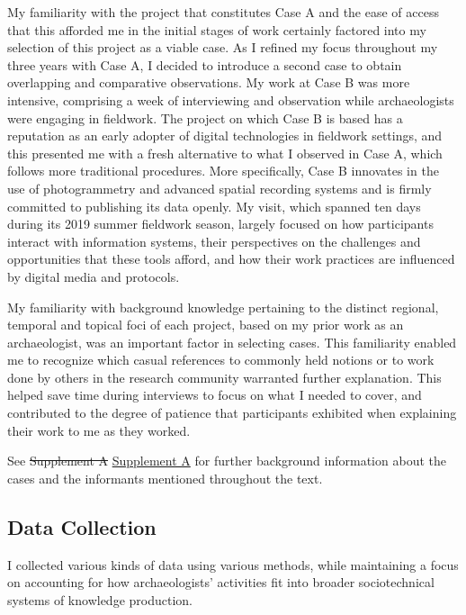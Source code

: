 \documentclass[
]{article}
\makeatletter
\providecommand{\DIFdel}[1]{{\protect\color{red}\sout{#1}}} %
\providecommand{\DIFaddbegin}{} %
\providecommand{\DIFaddend}{} %
\providecommand{\DIFdelbegin}{} %
\providecommand{\DIFdelend}{} %
\newcommand{\DIFscaledelfig}{0.5}
\newlength{\DIFdelgraphicswidth} %
\newlength{\DIFdelgraphicsheight} %
\newcommand{\DIFaddincludegraphics}[2][]{{\color{blue}\fbox{\DIFOincludegraphics[#1]{#2}}}} %
\newcommand{\DIFdelincludegraphics}[2][]{%
\sbox{\DIFdelgraphicsbox}{\DIFOincludegraphics[#1]{#2}}%
\settoboxwidth{\DIFdelgraphicswidth}{\DIFdelgraphicsbox} %
\settoboxtotalheight{\DIFdelgraphicsheight}{\DIFdelgraphicsbox} %
\scalebox{\DIFscaledelfig}{%
\parbox[b]{\DIFdelgraphicswidth}{\usebox{\DIFdelgraphicsbox}\\[-\baselineskip] \rule{\DIFdelgraphicswidth}{0em}}\llap{\resizebox{\DIFdelgraphicswidth}{\DIFdelgraphicsheight}{%
\setlength{\unitlength}{\DIFdelgraphicswidth}%
\begin{picture}(1,1)%
\thicklines\linethickness{2pt} %
{\color[rgb]{1,0,0}\put(0,0){\framebox(1,1){}}}%
{\color[rgb]{1,0,0}\put(0,0){\line( 1,1){1}}}%
{\color[rgb]{1,0,0}\put(0,1){\line(1,-1){1}}}%
\end{picture}%
}\hspace*{3pt}}} %
} %
\DeclareRobustCommand{\DIFaddbegin}{\DIFOaddbegin \let\includegraphics\DIFaddincludegraphics} %
\DeclareRobustCommand{\DIFaddend}{\DIFOaddend \let\includegraphics\DIFOincludegraphics} %
\DeclareRobustCommand{\DIFdelbegin}{\DIFOdelbegin \let\includegraphics\DIFdelincludegraphics} %
\DeclareRobustCommand{\DIFdelend}{\DIFOaddend \let\includegraphics\DIFOincludegraphics} %
\let\sout@orig\sout %
\renewcommand{\sout}[1]{\ifmmode\text{\sout@orig{\ensuremath{#1}}}\else\sout@orig{#1}\fi} %
\makeatother
\begin{document}
My familiarity with the project that constitutes Case A and the ease of
access that this afforded me in the initial stages of work certainly
factored into my selection of this project as a viable case. As I
refined my focus throughout my three years with Case A, I decided to
introduce a second case to obtain overlapping and comparative
observations. My work at Case B was more intensive, comprising a week of
interviewing and observation while archaeologists were engaging in
fieldwork. The project on which Case B is based has a reputation as an
early adopter of digital technologies in fieldwork settings, and this
presented me with a fresh alternative to what I observed in Case A,
which follows more traditional procedures. More specifically, Case B
innovates in the use of photogrammetry and advanced spatial recording
systems and is firmly committed to publishing its data openly. My visit,
which spanned ten days during its 2019 summer fieldwork season, largely
focused on how participants interact with information systems, their
perspectives on the challenges and opportunities that these tools
afford, and how their work practices are influenced by digital media and
protocols.

My familiarity with background knowledge pertaining to the distinct
regional, temporal and topical foci of each project, based on my prior
work as an archaeologist, was an important factor in selecting cases.
This familiarity enabled me to recognize which casual references to
commonly held notions or to work done by others in the research
community warranted further explanation. This helped save time during
interviews to focus on what I needed to cover, and contributed to the
degree of patience that participants exhibited when explaining their
work to me as they worked.

See \DIFdelbegin \DIFdel{Supplement A }\DIFdelend \DIFaddbegin \hyperref[supplement-a]{Supplement A} \DIFaddend for further background
information about the cases and the informants mentioned throughout the
text.

\subsection{Data Collection}\label{data-collection}

I collected various kinds of data using various methods, while
maintaining a focus on accounting for how archaeologists' activities fit
into broader sociotechnical systems of knowledge production.
\end{document}
